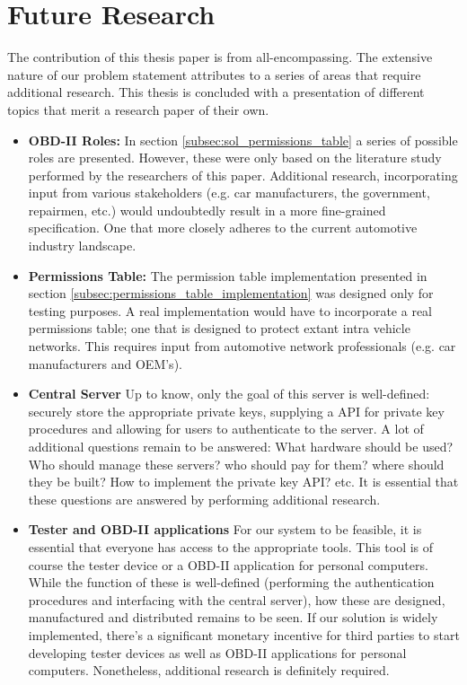 \section{Future Research}
The contribution of this thesis paper is from all-encompassing. The extensive nature of our problem statement attributes to a series of areas that require additional research. This thesis is concluded with a presentation of different topics that merit a research paper of their own.

\begin{itemize}
	\item \textbf{OBD-II Roles:} In section \ref{subsec:sol_permissions_table} a series of possible roles are presented. However, these were only based on the literature study performed by the researchers of this paper. Additional research, incorporating input from various stakeholders (e.g. car manufacturers, the government, repairmen, etc.) would undoubtedly result in a more fine-grained specification. One that more closely adheres to the current automotive industry landscape.
	
	\item \textbf{Permissions Table:} The permission table implementation presented in section \ref{subsec:permissions_table_implementation} was designed only for testing purposes. A real implementation would have to incorporate a real permissions table; one that is designed to protect extant intra vehicle networks. This requires input from automotive network professionals (e.g. car manufacturers and OEM's).
	
	\item \textbf{Central Server} Up to know, only the goal of this server is well-defined: securely store the appropriate private keys, supplying a API for private key procedures and allowing for users to authenticate to the server. A lot of additional questions remain to be answered: What hardware should be used? Who should manage these servers? who should pay for them? where should they be built? How to implement the private key API? etc. It is essential that these questions are answered by performing additional research.
	
	\item \textbf{Tester and OBD-II applications} For our system to be feasible, it is essential that everyone has access to the appropriate tools. This tool is of course the tester device or a OBD-II application for personal computers. While the function of these is well-defined (performing the authentication procedures and interfacing with the central server), how these are designed, manufactured and distributed remains to be seen. If our solution is widely implemented, there's a significant monetary incentive for third parties to start developing tester devices as well as OBD-II applications for personal computers. Nonetheless, additional research is definitely required.
\end{itemize}
